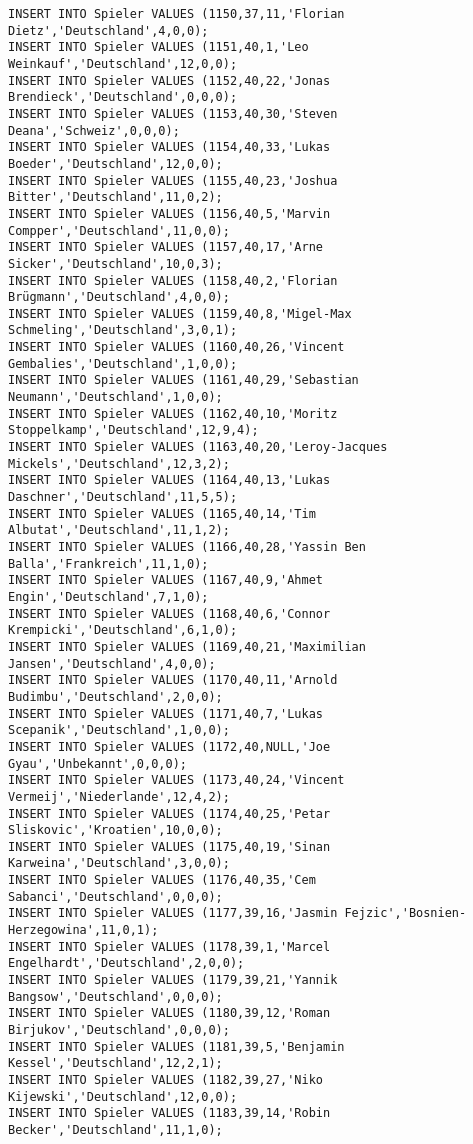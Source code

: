 \documentclass{lehramt-informatik-aufgabe}
\begin{document}
\begin{verbatim}
INSERT INTO Spieler VALUES (1150,37,11,'Florian Dietz','Deutschland',4,0,0);
INSERT INTO Spieler VALUES (1151,40,1,'Leo Weinkauf','Deutschland',12,0,0);
INSERT INTO Spieler VALUES (1152,40,22,'Jonas Brendieck','Deutschland',0,0,0);
INSERT INTO Spieler VALUES (1153,40,30,'Steven Deana','Schweiz',0,0,0);
INSERT INTO Spieler VALUES (1154,40,33,'Lukas Boeder','Deutschland',12,0,0);
INSERT INTO Spieler VALUES (1155,40,23,'Joshua Bitter','Deutschland',11,0,2);
INSERT INTO Spieler VALUES (1156,40,5,'Marvin Compper','Deutschland',11,0,0);
INSERT INTO Spieler VALUES (1157,40,17,'Arne Sicker','Deutschland',10,0,3);
INSERT INTO Spieler VALUES (1158,40,2,'Florian Brügmann','Deutschland',4,0,0);
INSERT INTO Spieler VALUES (1159,40,8,'Migel-Max Schmeling','Deutschland',3,0,1);
INSERT INTO Spieler VALUES (1160,40,26,'Vincent Gembalies','Deutschland',1,0,0);
INSERT INTO Spieler VALUES (1161,40,29,'Sebastian Neumann','Deutschland',1,0,0);
INSERT INTO Spieler VALUES (1162,40,10,'Moritz Stoppelkamp','Deutschland',12,9,4);
INSERT INTO Spieler VALUES (1163,40,20,'Leroy-Jacques Mickels','Deutschland',12,3,2);
INSERT INTO Spieler VALUES (1164,40,13,'Lukas Daschner','Deutschland',11,5,5);
INSERT INTO Spieler VALUES (1165,40,14,'Tim Albutat','Deutschland',11,1,2);
INSERT INTO Spieler VALUES (1166,40,28,'Yassin Ben Balla','Frankreich',11,1,0);
INSERT INTO Spieler VALUES (1167,40,9,'Ahmet Engin','Deutschland',7,1,0);
INSERT INTO Spieler VALUES (1168,40,6,'Connor Krempicki','Deutschland',6,1,0);
INSERT INTO Spieler VALUES (1169,40,21,'Maximilian Jansen','Deutschland',4,0,0);
INSERT INTO Spieler VALUES (1170,40,11,'Arnold Budimbu','Deutschland',2,0,0);
INSERT INTO Spieler VALUES (1171,40,7,'Lukas Scepanik','Deutschland',1,0,0);
INSERT INTO Spieler VALUES (1172,40,NULL,'Joe Gyau','Unbekannt',0,0,0);
INSERT INTO Spieler VALUES (1173,40,24,'Vincent Vermeij','Niederlande',12,4,2);
INSERT INTO Spieler VALUES (1174,40,25,'Petar Sliskovic','Kroatien',10,0,0);
INSERT INTO Spieler VALUES (1175,40,19,'Sinan Karweina','Deutschland',3,0,0);
INSERT INTO Spieler VALUES (1176,40,35,'Cem Sabanci','Deutschland',0,0,0);
INSERT INTO Spieler VALUES (1177,39,16,'Jasmin Fejzic','Bosnien-Herzegowina',11,0,1);
INSERT INTO Spieler VALUES (1178,39,1,'Marcel Engelhardt','Deutschland',2,0,0);
INSERT INTO Spieler VALUES (1179,39,21,'Yannik Bangsow','Deutschland',0,0,0);
INSERT INTO Spieler VALUES (1180,39,12,'Roman Birjukov','Deutschland',0,0,0);
INSERT INTO Spieler VALUES (1181,39,5,'Benjamin Kessel','Deutschland',12,2,1);
INSERT INTO Spieler VALUES (1182,39,27,'Niko Kijewski','Deutschland',12,0,0);
INSERT INTO Spieler VALUES (1183,39,14,'Robin Becker','Deutschland',11,1,0);

\end{verbatim}
\end{document}

